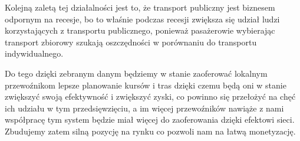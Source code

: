 Kolejną zaletą tej działalności jest to, że transport publiczny jest biznesem odpornym na recesje, bo to właśnie podczas recesji zwiększa się udział ludzi korzystających z transportu publicznego, ponieważ pasażerowie wybierając transport zbiorowy szukają oszczędności w porównaniu do transportu indywidualnego.

Do tego dzięki zebranym danym będziemy w stanie zaoferować lokalnym przewoźnikom lepsze planowanie kursów i tras dzięki czemu będą oni w stanie zwiększyć swoją efektywność i zwiększyć zyski, co powinno się przełożyć na chęć ich udziału w tym przedsięwzięciu, a im więcej przewoźników nawiąże z nami współpracę tym system będzie miał więcej do zaoferowania dzięki efektowi sieci. Zbudujemy zatem silną pozycję na rynku co pozwoli nam na łatwą monetyzację.